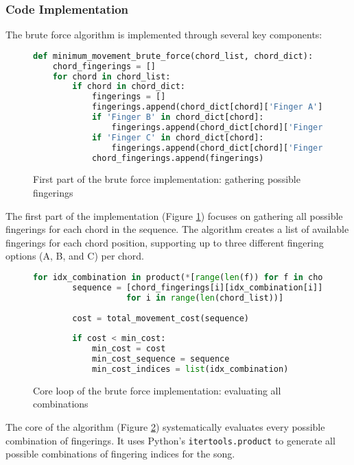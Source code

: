\documentclass[conference]{IEEEtran}
\begin{document}
\subsubsection{Code Implementation}
The brute force algorithm is implemented through several key components:

\begin{figure}[H]
\begin{lstlisting}[language=Python]
def minimum_movement_brute_force(chord_list, chord_dict):
    chord_fingerings = []
    for chord in chord_list:
        if chord in chord_dict:
            fingerings = []
            fingerings.append(chord_dict[chord]['Finger A'])
            if 'Finger B' in chord_dict[chord]:
                fingerings.append(chord_dict[chord]['Finger B'])
            if 'Finger C' in chord_dict[chord]:
                fingerings.append(chord_dict[chord]['Finger C'])
            chord_fingerings.append(fingerings)
\end{lstlisting}
\caption{First part of the brute force implementation: gathering possible fingerings}
\label{fig:BruteForceGather}
\end{figure}

The first part of the implementation (Figure \ref{fig:BruteForceGather}) focuses on gathering all possible fingerings for each chord in the sequence. The algorithm creates a list of available fingerings for each chord position, supporting up to three different fingering options (A, B, and C) per chord. 

\begin{figure}[H]
\begin{lstlisting}[language=Python]
    for idx_combination in product(*[range(len(f)) for f in chord_fingerings]):
        sequence = [chord_fingerings[i][idx_combination[i]] 
                   for i in range(len(chord_list))]
        
        cost = total_movement_cost(sequence)
        
        if cost < min_cost:
            min_cost = cost
            min_cost_sequence = sequence
            min_cost_indices = list(idx_combination)
\end{lstlisting}
\caption{Core loop of the brute force implementation: evaluating all combinations}
\label{fig:BruteForceCore}
\end{figure}

The core of the algorithm (Figure \ref{fig:BruteForceCore}) systematically evaluates every possible combination of fingerings. It uses Python's \lstinline{itertools.product} to generate all possible combinations of fingering indices for the song. 
\end{document}
